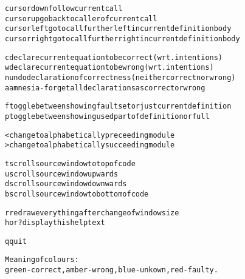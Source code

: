 \documentclass[12pt]{article}
\begin{document}
\begin{alltt}
 cursor down    follow current call
 cursor up      go back to caller of current call
 cursor left    go to call further left in current definition body
 cursor right   go to call further right in current definition body

 c     declare current equation to be correct (wrt. intentions)
 w     declare current equation to be wrong (wrt. intentions)
 n     undo declaration of correctness (neither correct nor wrong)
 a     amnesia - forget all declarations as correct or wrong

 f     toggle between showing fault set or just current definition
 p     toggle between showing used part of definition or full

 <     change to alphabetically preceeding module
 >     change to alphabetically succeeding module

 t     scroll source window to top of code
 u     scroll source window upwards
 d     scroll source window downwards
 b     scroll source window to bottom of code

 r              redraw everything after change of window size
 h or ?         display this help text

 q              quit


Meaning of colours:
green - correct, amber - wrong, blue - unkown, red - faulty.
\end{alltt}
\end{document}
